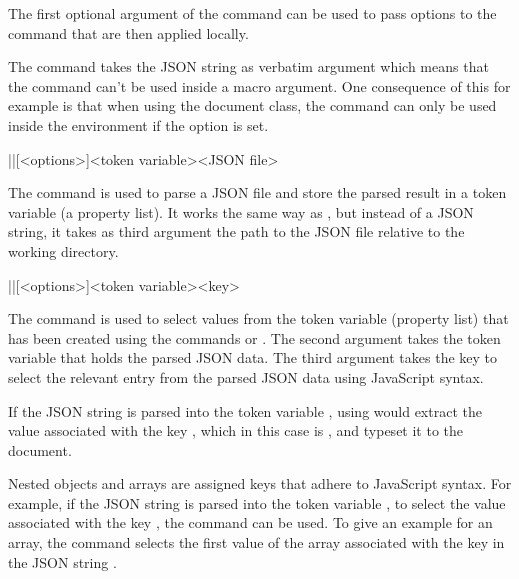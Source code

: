 \documentclass[a4paper]{article}
\begin{document}
{{The first optional argument of the command \macro{\JSONParse} can be used to pass options to the command that are then applied locally.

\warning The command \macro{\JSONParse} takes the JSON string as verbatim argument which means that the command can't be used inside a macro argument. One consequence of this for example is that when using the  document class, the command \macro{\JSONParse} can only be used inside the  environment if the  option is set.

\begin{macrodef}
|\JSONParseFromFile|[<options>]{<token variable>}{<JSON file>}
\end{macrodef}
The command \macro{\JSONParseFromFile} is used to parse a JSON file and store the parsed result in a token variable (a property list). It works the same way as \macro{\JSONParse}, but instead of a JSON string, it takes as third argument the path to the JSON file relative to the working directory.

\begin{macrodef}
|\JSONParseValue|[<options>]{<token variable>}{<key>}
\end{macrodef}
The command \macro{\JSONParseValue} is used to select values from the token variable (property list) that has been created using the commands \macro{\JSONParse} or \macro{\JSONParseFromFile}. The second argument takes the token variable that holds the parsed JSON data. The third argument takes the key to select the relevant entry from the parsed JSON data using JavaScript syntax.

If the JSON string  is parsed into the token variable \macro{\myJSONdata}, using  would extract the value associated with the key , which in this case is , and typeset it to the document.

Nested objects and arrays are assigned keys that adhere to JavaScript syntax. For example, if the JSON string  is parsed into the token variable \macro{\myJSONdata}, to select the value associated with the key , the command  can be used. To give an example for an array, the command  selects the first value of the array associated with the key  in the JSON string .

}}
\end{document}
